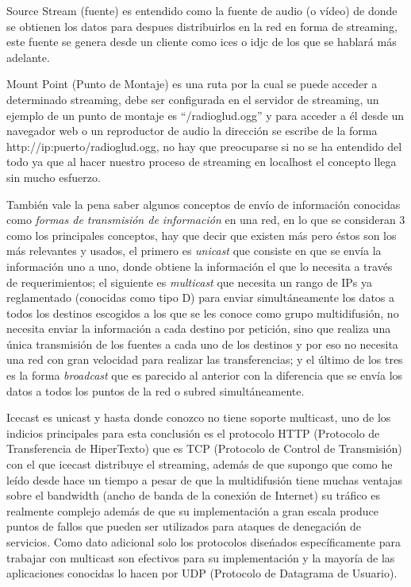 \begin{multicols}{2}
Source Stream (fuente) es entendido como la fuente de audio (o vídeo) de donde se obtienen los datos para despues distribuirlos en la red en forma de streaming, este fuente se genera desde un cliente como ices o idjc de los que se hablará más adelante.

Mount Point (Punto de Montaje) es una ruta por la cual se puede acceder a determinado streaming, debe ser configurada en el servidor de streaming, un ejemplo de un punto de montaje es ``/radioglud.ogg'' y para acceder a él desde un navegador web o un reproductor de audio la dirección se escribe de la forma http://ip:puerto/radioglud.ogg, no hay que preocuparse si no se ha entendido del todo ya que al hacer nuestro proceso de streaming en localhost el concepto llega sin mucho esfuerzo.

También vale la pena saber algunos conceptos de envío de información conocidas como {\em formas de transmisión de información} en una red, en lo que se consideran 3 como los principales conceptos, hay que decir que existen más pero éstos son los más relevantes y usados, el primero es {\em unicast} que consiste en que se envía la información uno a uno, donde obtiene la información el que lo necesita a través de requerimientos; el siguiente es {\em multicast} que necesita un rango de IPs ya reglamentado (conocidas como tipo D) para enviar simultáneamente los datos a todos los destinos escogidos a los que se les conoce como grupo multidifusión, no necesita enviar la información a cada destino por petición, sino que realiza una única transmisión de los fuentes a cada uno de los destinos y por eso no necesita una red con gran velocidad para realizar las transferencias; y el último de los tres es la forma {\em broadcast} que es parecido al anterior con la diferencia que se envía los datos a todos los puntos de la red o subred simultáneamente.

Icecast es unicast y hasta donde conozco no tiene soporte multicast, uno de los indicios principales para esta conclusión es el protocolo HTTP (Protocolo de Transferencia de HiperTexto) que es TCP (Protocolo de Control de Transmisión) con el que icecast distribuye el streaming, además de que supongo que como he leído desde hace un tiempo a pesar de que la multidifusión tiene muchas ventajas sobre el bandwidth (ancho de banda de la conexión de Internet) su tráfico es realmente complejo además de que su implementación a gran escala produce puntos de fallos que pueden ser utilizados para ataques de denegación de servicios. Como dato adicional solo los protocolos diseńados específicamente para trabajar con multicast son efectivos para su implementación y la mayoría de las aplicaciones conocidas lo hacen por UDP (Protocolo de Datagrama de Usuario).


\end{multicols}

